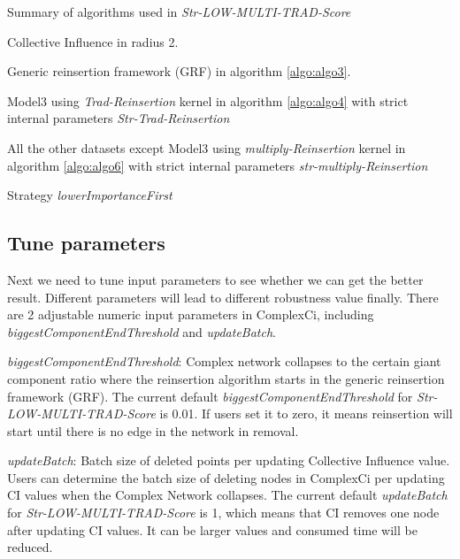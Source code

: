 \documentclass{article}
\begin{document}
		\begin{algorithm}[!htbp]
			\caption{ Summary of algorithms used in \textit{Str-LOW-MULTI-TRAD-Score} }
			\label{algo:algo7}
			\begin{algorithmic}[1]
				\State Collective Influence in radius 2.
				
				\State Generic reinsertion framework (GRF) in algorithm \ref{algo:algo3}.
				
				\State Model3 using \textit{Trad-Reinsertion} kernel in algorithm \ref{algo:algo4} with strict internal parameters \textit{Str-Trad-Reinsertion}
				
				\State All the other datasets except Model3 using \textit{multiply-Reinsertion} kernel in algorithm \ref{algo:algo6}  with strict internal parameters \textit{str-multiply-Reinsertion}
				
				\State Strategy \textit{lowerImportanceFirst}
				
				
			\end{algorithmic}
		\end{algorithm}


	 
	 \subsection{Tune parameters}
	 
	 
	 Next we need to tune input parameters to see whether we can get the better result. Different parameters will lead to different robustness value finally. There are 2 adjustable numeric input parameters in ComplexCi, including \textit{biggestComponentEndThreshold} and \textit{updateBatch}. 
	 	 
	\begin{enumerate}
	
		\begin{item}	
			\textit{biggestComponentEndThreshold}: Complex network collapses to the certain giant component ratio where the reinsertion algorithm starts in the generic reinsertion framework (GRF). The current default \textit{biggestComponentEndThreshold} for \textit{Str-LOW-MULTI-TRAD-Score} is 0.01. If users set it to zero, it means reinsertion will start until there is no edge in the network in removal.
		\end{item}
		
		\begin{item}	
			\textit{updateBatch}: Batch size of deleted points per updating Collective Influence value. Users can determine the batch size of deleting nodes in ComplexCi per updating CI values when the Complex Network collapses. The current default \textit{updateBatch} for \textit{Str-LOW-MULTI-TRAD-Score} is 1, which means that CI removes one node after updating CI values. It can be larger values and consumed time will be reduced.
		\end{item}	

	\end{enumerate}	
	 
\end{document}
